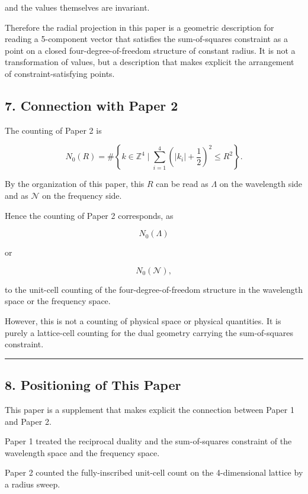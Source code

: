 \documentclass[
]{article}
\begin{document}
and the values themselves are invariant.

Therefore the radial projection in this paper is a geometric description
for reading a 5-component vector that satisfies the sum-of-squares
constraint as a point on a closed four-degree-of-freedom structure of
constant radius. It is not a transformation of values, but a description
that makes explicit the arrangement of constraint-satisfying points.

\subsection{7. Connection with Paper 2}\label{connection-with-paper-2}

The counting of Paper 2 is

\[
N_0(R)
=
\#\left\{
k\in\mathbb{Z}^4
\mid
\sum_{i=1}^{4}
\left(|k_i|+\frac12\right)^2
\le R^2
\right\} .
\]

By the organization of this paper, this \(R\) can be read as \(\Lambda\)
on the wavelength side and as \(\mathcal{N}\) on the frequency side.

Hence the counting of Paper 2 corresponds, as

\[
N_0(\Lambda)
\]

or

\[
N_0(\mathcal{N}) ,
\]

to the unit-cell counting of the four-degree-of-freedom structure in the
wavelength space or the frequency space.

However, this is not a counting of physical space or physical
quantities. It is purely a lattice-cell counting for the dual geometry
carrying the sum-of-squares constraint.

\begin{center}\rule{0.5\linewidth}{0.5pt}\end{center}

\subsection{8. Positioning of This
Paper}\label{positioning-of-this-paper}

This paper is a supplement that makes explicit the connection between
Paper 1 and Paper 2.

Paper 1 treated the reciprocal duality and the sum-of-squares constraint
of the wavelength space and the frequency space.

Paper 2 counted the fully-inscribed unit-cell count on the 4-dimensional
lattice by a radius sweep.
\end{document}
